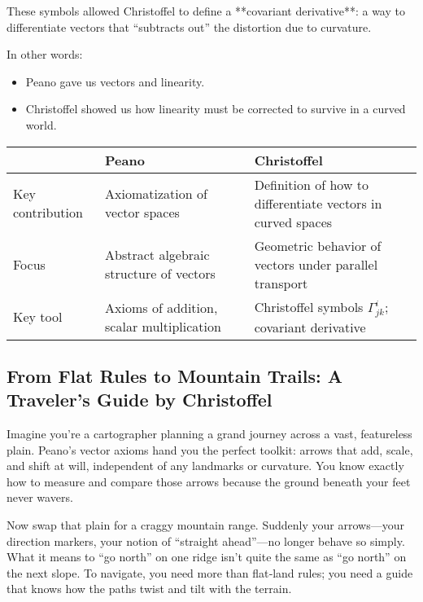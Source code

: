 These symbols allowed Christoffel to define a **covariant derivative**:  
a way to differentiate vectors that “subtracts out” the distortion due to curvature.

In other words:

\begin{itemize}
    \item Peano gave us vectors and linearity.  
    \item Christoffel showed us how linearity must be corrected to survive in a curved world.
\end{itemize}

\bigskip

\begin{tcolorbox}[colback=gray!5!white, colframe=black, title=\textbf{Sidebar: The Shift from Peano to Christoffel}, fonttitle=\bfseries, arc=1.5mm, boxrule=0.4pt]

\begin{tabular}{>{\raggedright}p{4cm} >{\raggedright}p{5.5cm} >{\raggedright\arraybackslash}p{5.5cm}}
 & \textbf{Peano} & \textbf{Christoffel} \\
\midrule
Key contribution & Axiomatization of vector spaces & Definition of how to differentiate vectors in curved spaces \\
Focus & Abstract algebraic structure of vectors & Geometric behavior of vectors under parallel transport \\
Key tool & Axioms of addition, scalar multiplication & Christoffel symbols \( \Gamma^i_{jk} \); covariant derivative
\end{tabular}

\end{tcolorbox}

\bigskip

\subsection{From Flat Rules to Mountain Trails: A Traveler’s Guide by Christoffel}

Imagine you’re a cartographer planning a grand journey across a vast, featureless plain.  Peano’s vector axioms hand you the perfect toolkit: arrows that add, scale, and shift at will, independent of any landmarks or curvature.  You know exactly how to measure and compare those arrows because the ground beneath your feet never wavers.

Now swap that plain for a craggy mountain range.  Suddenly your arrows—your direction markers, your notion of “straight ahead”—no longer behave so simply.  What it means to “go north” on one ridge isn’t quite the same as “go north” on the next slope.  To navigate, you need more than flat‐land rules; you need a guide that knows how the paths twist and tilt with the terrain.

